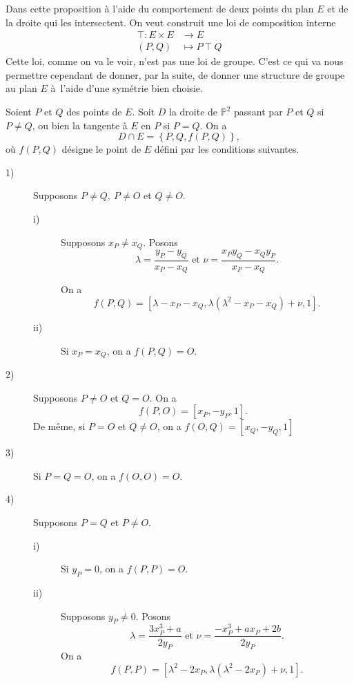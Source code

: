 
Dans cette proposition à l'aide du comportement de deux points du plan $E$ et de la droite qui les intersectent. On veut construit une loi de composition interne
\[
\begin{align*}
    \top : E \times E &\longrightarrow E \\
    (P,Q) &\longmapsto P  \ \top  \ Q
\end{align*}
\] 
Cette loi, comme on va le voir, n'est pas une loi de groupe. C'est ce qui va nous permettre cependant de donner, par la suite, de donner une structure de groupe au plan $E$ à l'aide d'une symétrie bien choisie.

\begin{proposition}
    Soient $P$ et $Q$ des points de $E$. Soit $D$ la droite de $\mathbb{P}^2$ passant par $P$ et $Q$ si $P \neq Q$, ou bien la tangente à $E$ en $P$ si $P = Q$. On a
    \[
    D \cap E = \left\{ P, Q, f(P,Q) \right\}
    ,\] 
    où $f(P,Q)$ désigne le point de $E$ défini par les conditions suivantes.
    \begin{description}
        \item[1)] Supposons $P \neq Q, \ P \neq O$ et $Q \neq O$.
            \begin{description}
                \item[i)] Supposons $x_{P} \neq x_{Q}$. Posons
                    \[
                    \lambda = \frac{y_{P} - y_{Q}}{x_{P} - x_{Q}} \text{ et } \nu = \frac{x_{P}y_{Q} - x_{Q}y_{P}}{x_{P} - x_{Q}}
                    .\] 

On a 
\[
f(P,Q) = \left[ \lambda - x_{P} - x_{Q}, \lambda \left( \lambda^2 - x_{P} - x_{Q} \right) + \nu, 1 \right]
.\] 
                \item[ii)] Si $x_{P} = x_{Q}$, on a $f(P,Q) = O$.
            \end{description}
        \item[2)] Supposons $P \neq O$ et $Q = O$. On a
            \[
            f(P,O) = \left[ x_{P}, -y_{P}, 1 \right]
            .\] 
            De même, si $P = O$ et $Q \neq O$, on a $f(O,Q) = \left[ x_{Q}, -y_{Q}, 1 \right]$
        \item[3)] Si $P = Q = O$, on a $f(O,O) = O$.
        \item[4)]  Supposons $P = Q$ et $P \neq O$.
            \begin{description}
                \item[i)] Si $y_{P} = 0$, on a $f(P,P) = O$.
                \item[ii)] Supposons $y_{P} \neq 0$. Posons
                    \[
                    \lambda = \frac{3x_{P}^3 + a}{2y_{P}} \text{ et } \nu = \frac{-x_{P}^3 + ax_{P} + 2b}{2y_{P}}
                    .\] 
On a
\[
f(P,P) = \left[ \lambda^2 - 2 x_{P}, \lambda\left( \lambda^2 - 2x_{P} \right) + \nu, 1 \right]
.\] 
            \end{description}
    \end{description}
\end{proposition}


